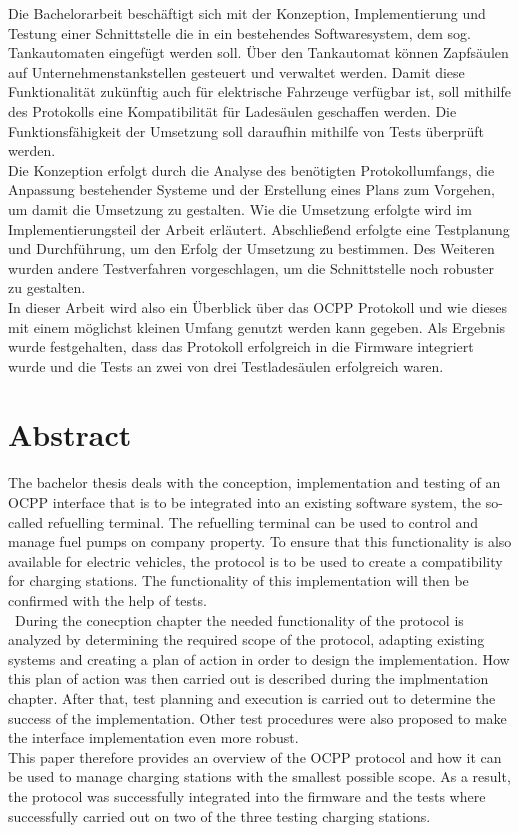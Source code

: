 Die Bachelorarbeit beschäftigt sich mit der Konzeption, Implementierung und Testung einer  Schnittstelle die in ein bestehendes Softwaresystem, dem sog. Tankautomaten eingefügt werden soll. Über den Tankautomat können Zapfsäulen auf Unternehmenstankstellen gesteuert und verwaltet werden. Damit diese Funktionalität zukünftig auch für elektrische Fahrzeuge verfügbar ist, soll mithilfe des Protokolls eine Kompatibilität für Ladesäulen geschaffen werden. Die Funktionsfähigkeit der Umsetzung soll daraufhin mithilfe von Tests überprüft werden.\\
\noindent Die Konzeption erfolgt durch die Analyse des benötigten Protokollumfangs, die Anpassung bestehender Systeme und der Erstellung eines Plans zum Vorgehen, um damit die Umsetzung zu gestalten. Wie die Umsetzung erfolgte wird im Implementierungsteil der Arbeit erläutert. Abschließend erfolgte eine Testplanung und Durchführung, um den Erfolg der Umsetzung zu bestimmen. Des Weiteren wurden andere Testverfahren vorgeschlagen, um die Schnittstelle noch robuster zu gestalten. \\
\noindent In dieser Arbeit wird also ein Überblick über das \acs{OCPP} Protokoll und wie dieses mit einem möglichst kleinen Umfang genutzt werden kann gegeben. Als Ergebnis wurde festgehalten, dass das Protokoll erfolgreich in die Firmware integriert wurde und die Tests an zwei von drei Testladesäulen erfolgreich waren.
\thispagestyle{empty}
\newpage

\section*{Abstract}
The bachelor thesis deals with the conception, implementation and testing of an \ac{OCPP} interface that is to be integrated into an existing software system, the so-called refuelling terminal. The refuelling terminal can be used to control and manage fuel pumps on company property. To ensure that this functionality is also available for electric vehicles, the protocol is to be used to create a compatibility for charging stations. The functionality of this implementation will then be confirmed with the help of tests.\\\
\noindent During the conecption chapter the needed functionality of the protocol is analyzed by determining the required scope of the protocol, adapting existing systems and creating a plan of action in order to design the implementation. How this plan of action was then carried out is described during the implmentation chapter. After that, test planning and execution is carried out to determine the success of the implementation. Other test procedures were also proposed to make the interface implementation even more robust. \\
\noindent This paper therefore provides an overview of the \acs{OCPP} protocol and how it can be used to manage charging stations with the smallest possible scope. As a result, the protocol was successfully integrated into the firmware and the tests where successfully carried out on two of the three testing charging stations.
